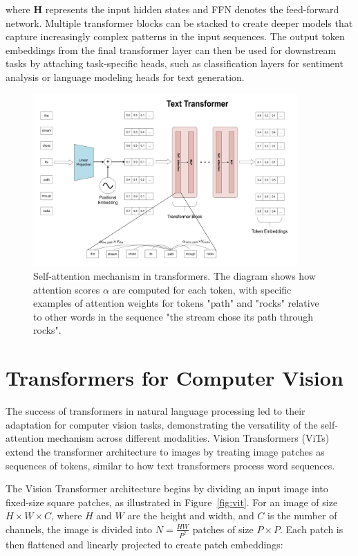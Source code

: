 where $\mathbf{H}$ represents the input hidden states and FFN denotes the feed-forward network. Multiple transformer blocks can be stacked to create deeper models that capture increasingly complex patterns in the input sequences. The output token embeddings from the final transformer layer can then be used for downstream tasks by attaching task-specific heads, such as classification layers for sentiment analysis or language modeling heads for text generation.

\begin{figure}[tb]
\centering
\includegraphics[width=0.9\textwidth]{../Images/transformer.png}
\caption{Self-attention mechanism in transformers. The diagram shows how attention scores $\alpha$ are computed for each token, with specific examples of attention weights for tokens "path" and "rocks" relative to other words in the sequence "the stream chose its path through rocks".}
\label{fig:transformer}
\end{figure}

\section{Transformers for Computer Vision}

The success of transformers in natural language processing led to their adaptation for computer vision tasks, demonstrating the versatility of the self-attention mechanism across different modalities. Vision Transformers (ViTs) extend the transformer architecture to images by treating image patches as sequences of tokens, similar to how text transformers process word sequences.

The Vision Transformer architecture begins by dividing an input image into fixed-size square patches, as illustrated in Figure~\ref{fig:vit}. For an image of size $H \times W \times C$, where $H$ and $W$ are the height and width, and $C$ is the number of channels, the image is divided into $N = \frac{HW}{P^2}$ patches of size $P \times P$. Each patch is then flattened and linearly projected to create patch embeddings:

